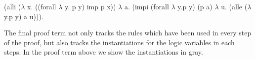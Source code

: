 \documentclass{llncs}
\newcommand{\mygray}[1]{{\color{gray}#1}}
\newcommand{\figfoot}{\vspace{1ex}\hrule}
\newcommand{\fighead}{\hrule\vspace{1.5ex}}
\newcommand{\vd}{\vdash}
\newcommand{\arrow}{\rightarrow}
\newcommand{\oftp}{\mathord{:}}
\begin{document}
\begin{code}
(alli {\mygray{($\lambda\!\!$ x. ((forall $\lambda\!\!$ y. p y) imp p x))}}
   $\lambda\!\!$ a. (impi {\mygray{(forall $\lambda\!\!$ y.p y) (p a)}}
           $\lambda\!\!$ u. (alle {\mygray{($\lambda\!\!$ y.p y)}} a u))).
\end{code}

The final proof term not only tracks the rules which have been used in
every step of the proof, but also tracks the instantiations for the logic
variables in each steps. In the proof term above we show the
instantiations in gray.





\end{document}
